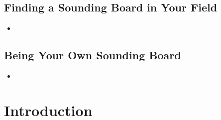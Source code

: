 \documentclass[11pt]{article}
\begin{document}
\subsection{Finding a Sounding Board in Your Field}
\begin{itemize}
\item \begin{exercise}
\end{exercise}
\end{itemize}
\subsection{Being Your Own Sounding Board}
\begin{itemize}
\item \begin{exercise}
\end{exercise}
\end{itemize}
\newpage
\section{Introduction}
\end{document}
